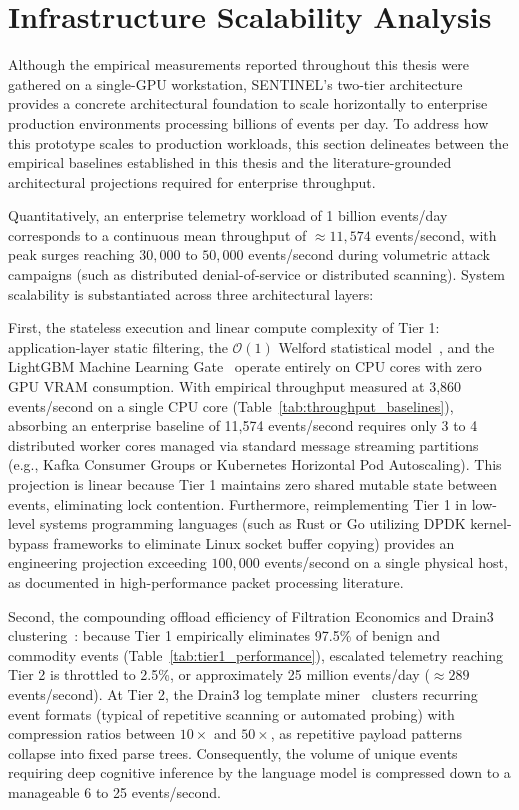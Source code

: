 \section{Infrastructure Scalability Analysis}
\label{sec:scalability_analysis}

Although the empirical measurements reported throughout this thesis were gathered on a single-GPU workstation, SENTINEL's two-tier architecture provides a concrete architectural foundation to scale horizontally to enterprise production environments processing billions of events per day. To address how this prototype scales to production workloads, this section delineates between the empirical baselines established in this thesis and the literature-grounded architectural projections required for enterprise throughput.

Quantitatively, an enterprise telemetry workload of 1 billion events/day corresponds to a continuous mean throughput of $\approx 11,574$ events/second, with peak surges reaching $30,000$ to $50,000$ events/second during volumetric attack campaigns (such as distributed denial-of-service or distributed scanning). System scalability is substantiated across three architectural layers:

First, the stateless execution and linear compute complexity of Tier 1: application-layer static filtering, the $\mathcal{O}(1)$ Welford statistical model~\cite{welford1962}, and the LightGBM Machine Learning Gate~\cite{ke2017lightgbm} operate entirely on CPU cores with zero GPU VRAM consumption. With empirical throughput measured at 3,860 events/second on a single CPU core (Table~\ref{tab:throughput_baselines}), absorbing an enterprise baseline of 11,574 events/second requires only 3 to 4 distributed worker cores managed via standard message streaming partitions (e.g., Kafka Consumer Groups or Kubernetes Horizontal Pod Autoscaling). This projection is linear because Tier 1 maintains zero shared mutable state between events, eliminating lock contention. Furthermore, reimplementing Tier 1 in low-level systems programming languages (such as Rust or Go utilizing DPDK kernel-bypass frameworks to eliminate Linux socket buffer copying) provides an engineering projection exceeding $100,000$ events/second on a single physical host, as documented in high-performance packet processing literature.

Second, the compounding offload efficiency of Filtration Economics and Drain3 clustering~\cite{he2017drain}: because Tier 1 empirically eliminates 97.5\% of benign and commodity events (Table~\ref{tab:tier1_performance}), escalated telemetry reaching Tier 2 is throttled to 2.5\%, or approximately 25 million events/day ($\approx 289$ events/second). At Tier 2, the Drain3 log template miner~\cite{he2017drain} clusters recurring event formats (typical of repetitive scanning or automated probing) with compression ratios between $10\times$ and $50\times$, as repetitive payload patterns collapse into fixed parse trees. Consequently, the volume of unique events requiring deep cognitive inference by the language model is compressed down to a manageable 6 to 25 events/second.

